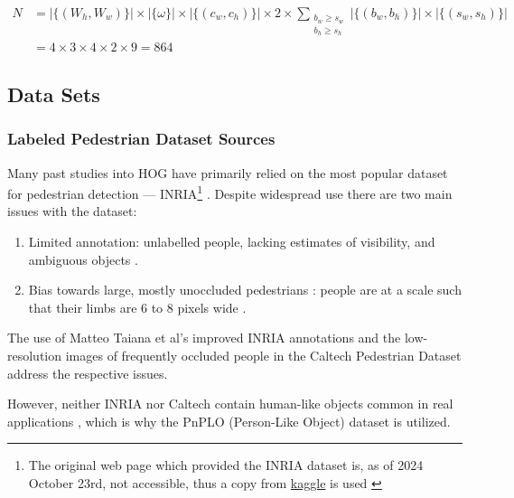 \begin{equation}\label{eq:number_sets}
\begin{split}
N &= |\{(W_h, W_w)\}| \times |\{\omega\}| \times |\{(c_w, c_h)\}| \times 2 \times \sum_{\substack{b_w \geq s_w \\ b_h \geq s_h}} |\{(b_w, b_h)\}| \times |\{(s_w, s_h)\}|  \\
&= 4 \times 3 \times 4 \times 2 \times 9  =864
\end{split}
\end{equation}

\subsection{Data Sets}

\subsubsection{Labeled Pedestrian Dataset Sources}

Many past studies into HOG have primarily \cite{zhou_2021_research} relied on the most popular dataset for pedestrian detection — INRIA\footnote{The original web page which provided the INRIA dataset is, as of 2024 October 23rd, not accessible, thus a copy from \href{kaggle.com}{kaggle} is used \cite{inria_data_copy}} \cite{inria_data_copy} \cite{dalal_2005_histograms} \cite{dollar_2012_pedestrian}. Despite widespread use there are two main issues with the dataset:

\begin{enumerate}
    \item Limited annotation: unlabelled people, lacking estimates of visibility, and ambiguous objects \cite{inria_improved}. 
    \item Bias towards large, mostly unoccluded pedestrians \cite{dollar_2009_pedestrian}: people are at a scale such that their limbs are 6 to 8 pixels wide \cite{dalal_2005_histograms}.
\end{enumerate}

The use of Matteo Taiana et al's improved INRIA annotations \cite{inria_improved} and the low-resolution images of frequently occluded people in the Caltech Pedestrian Dataset \cite{dollar_2009_pedestrian} address the respective issues.

However, neither INRIA nor Caltech contain human-like objects common in real applications \cite{karthika_2020_addressing}, which is why the PnPLO (Person-Like Object) dataset \cite{karthika_2020_addressing} is utilized.

